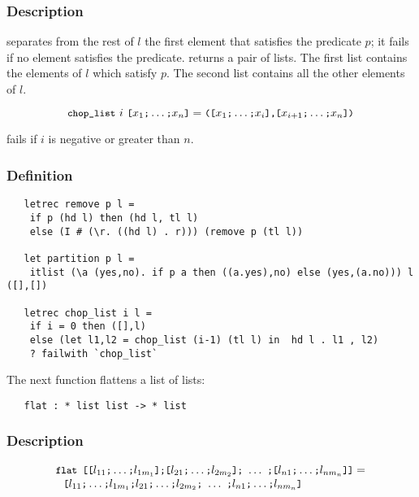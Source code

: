 \subsubsection*{Description}

 separates from the rest of $l$ the first element that
satisfies the predicate $p$; it fails if no element satisfies the predicate.
 returns a pair of lists. The first list contains the
elements of $l$ which satisfy $p$. The second list contains all the other
elements of $l$.

\[ \ml{chop\_list}\ i\ \ml{[}x_1\ml{;}\ldots\ml{;}x_n\ml{]} =
\ml{([}x_1\ml{;}\ldots\ml{;}x_i\ml{],[}x_{i+1}\ml{;}\ldots\ml{;}x_n\ml{])} \]

\noindent {} fails if $i$ is negative or greater than $n$.

\subsubsection*{Definition}

\begin{hol}\begin{verbatim}
   letrec remove p l =
    if p (hd l) then (hd l, tl l)
    else (I # (\r. ((hd l) . r))) (remove p (tl l))

   let partition p l =
    itlist (\a (yes,no). if p a then ((a.yes),no) else (yes,(a.no))) l ([],[])

   letrec chop_list i l =
    if i = 0 then ([],l)
    else (let l1,l2 = chop_list (i-1) (tl l) in  hd l . l1 , l2)
    ? failwith `chop_list`
\end{verbatim}\end{hol}


\noindent The next function flattens a list of lists:

\begin{boxed}
\begin{verbatim}
   flat : * list list -> * list
\end{verbatim}\end{boxed}

\subsubsection*{Description}

\[ \begin{array}{l}\ml{flat\ [[}l_{11}\ml{;}\ldots\ml{;}l_{1{m_1}}
\ml{];[}l_{21}\ml{;}\ldots\ml{;}l_{2{m_2}}\ml{];}\ \ldots\ 
\ml{;[}l_{n1}\ml{;}\ldots\ml{;}l_{n{m_n}}\ml{]]} =\\
\ \ \ml{[}l_{11}\ml{;}\ldots\ml{;}l_{1{m_1}}
\ml{;}l_{21}\ml{;}\ldots\ml{;}l_{2{m_2}}\ml{;}\ \ldots\ 
\ml{;}l_{n1}\ml{;}\ldots\ml{;}l_{n{m_n}}\ml{]}
\end{array} \]

